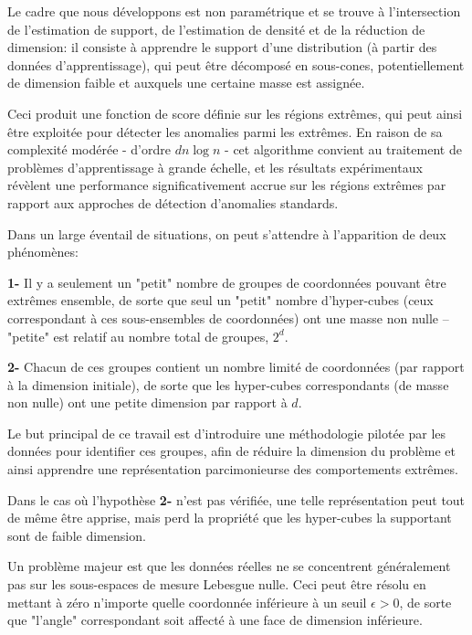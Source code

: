 \documentclass[a4paper, 12pt]{article}
\begin{document}
Le cadre que nous développons est non paramétrique et se trouve à l'intersection de l'estimation de support, de l'estimation de densité et de la réduction de dimension: il consiste à apprendre le support d'une distribution (à partir des données d'apprentissage),  qui peut être décomposé en sous-cones, potentiellement de dimension faible et auxquels une certaine masse est assignée.%

Ceci produit une fonction de score définie sur les régions extrêmes, qui peut ainsi être exploitée pour détecter les anomalies parmi les extrêmes.
En raison de sa complexité modérée - d'ordre $ dn \log n $ - cet algorithme convient au traitement de problèmes d'apprentissage à grande échelle, et les résultats expérimentaux révèlent une performance significativement accrue sur les régions extrêmes par rapport aux approches de détection d'anomalies standards.


Dans un large éventail de situations, on peut s'attendre à l'apparition de deux phénomènes:

\textbf{1-} Il y a seulement un "petit" nombre de groupes de coordonnées pouvant être extrêmes ensemble, de sorte que seul un "petit" nombre d'hyper-cubes (ceux correspondant à ces sous-ensembles de coordonnées) ont une masse non nulle -- "petite" est relatif au nombre total de groupes, $2^d$.

\textbf{2-} Chacun de ces groupes contient un nombre limité de coordonnées (par rapport à la dimension initiale), de sorte que les hyper-cubes correspondants (de masse non nulle) ont une petite dimension par rapport à $ d $.

Le but principal de ce travail est d'introduire une méthodologie pilotée par les données pour identifier ces groupes, afin de réduire la
dimension du problème et ainsi apprendre une représentation parcimonieurse des comportements extrêmes.

Dans le cas où l'hypothèse \textbf{2-} n'est pas vérifiée, une telle représentation peut tout de même être apprise, mais perd la propriété que les hyper-cubes la supportant sont de faible dimension.

Un problème majeur est que les données réelles ne se concentrent généralement pas sur les sous-espaces de mesure Lebesgue nulle. Ceci peut être résolu en mettant à zéro n'importe quelle coordonnée inférieure à un seuil $ \epsilon> 0 $, de sorte que "l'angle" correspondant soit affecté à une face de dimension inférieure.
\end{document}
